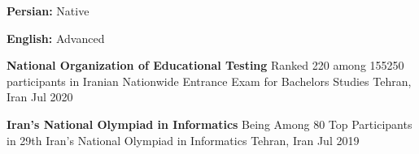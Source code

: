 \documentclass[]{awesome-cv}
\begin{document}
\begin{cvitems}
    \vspace{2mm}
    \item {\textbf{Persian:} Native}
    \vspace{1mm}
    \item {\textbf{English:} Advanced}
\end{cvitems}
\vspace{4mm}
\begin{cventries}
    \vspace{2mm}
	\cventry
	{\textbf{National Organization of Educational Testing}}
	{Ranked 220 among 155250 participants in Iranian Nationwide Entrance Exam for Bachelor\textquotesingle{}s Studies}
	{Tehran, Iran}
	{Jul 2020}
	{\begin{cvitems}
	\end{cvitems}}
	\cventry
	{\textbf{Iran's National Olympiad in Informatics}}
    {Being Among 80 Top Participants in 29th Iran's National Olympiad in Informatics}
	{Tehran, Iran}
	{Jul 2019}
	{\begin{cvitems}
	\end{cvitems}}
\end{cventries}
\end{document}
